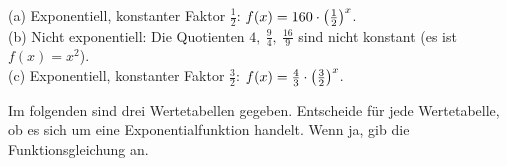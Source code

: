 \documentclass[11pt]{exam}
\begin{document}
\begin{questions}
{\begin{solution}
		(a) Exponentiell, konstanter Faktor $\frac{1}{2}$: $f(x)=160\cdot\left(\frac{1}{2}\right)^x$.\\
		(b) Nicht exponentiell: Die Quotienten $4,\ \frac{9}{4},\ \frac{16}{9}$ sind nicht konstant (es ist $f(x)=x^2$).\\
		(c) Exponentiell, konstanter Faktor $\frac{3}{2}$: $f(x)=\frac{4}{3}\cdot\left(\frac{3}{2}\right)^x$.
\end{solution}}
{\antwort{7.5}}

\question[3]
Im folgenden sind drei Wertetabellen gegeben. Entscheide für jede Wertetabelle, ob es sich um eine Exponentialfunktion handelt. Wenn ja, gib die Funktionsgleichung an.
\end{questions}
\end{document}
